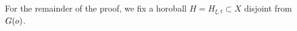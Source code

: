 %


For the remainder of the proof, we fix a horoball $H = H_{\xi,t} \subset X$ disjoint from $G(o)$.

